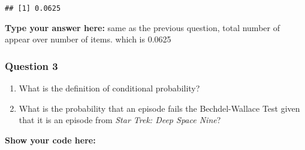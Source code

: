 \documentclass[
]{article}
\newenvironment{Shaded}{\begin{snugshade}}{\end{snugshade}}
\newcommand{\CommentTok}[1]{\textcolor[rgb]{0.56,0.35,0.01}{\textit{#1}}}
\newcommand{\KeywordTok}[1]{\textcolor[rgb]{0.13,0.29,0.53}{\textbf{#1}}}
\newcommand{\NormalTok}[1]{#1}
\newcommand{\OperatorTok}[1]{\textcolor[rgb]{0.81,0.36,0.00}{\textbf{#1}}}
\newcommand{\OtherTok}[1]{\textcolor[rgb]{0.56,0.35,0.01}{#1}}
\newcommand{\StringTok}[1]{\textcolor[rgb]{0.31,0.60,0.02}{#1}}
\providecommand{\tightlist}{%
  \setlength{\itemsep}{0pt}\setlength{\parskip}{0pt}}
\begin{document}
\begin{verbatim}
## [1] 0.0625
\end{verbatim}

\textbf{Type your answer here:} same as the previous question, total
number of appear over number of items. which is 0.0625

\hypertarget{question-3-1}{%
\subsubsection{Question 3}\label{question-3-1}}

\begin{enumerate}
\def\labelenumi{\alph{enumi}.}
\tightlist
\item
  What is the definition of conditional probability?
\item
  What is the probability that an episode fails the Bechdel-Wallace Test
  given that it is an episode from \emph{Star Trek: Deep Space Nine}?
\end{enumerate}

\textbf{Show your code here:}

\begin{Shaded}
\end{Shaded}
\end{document}
